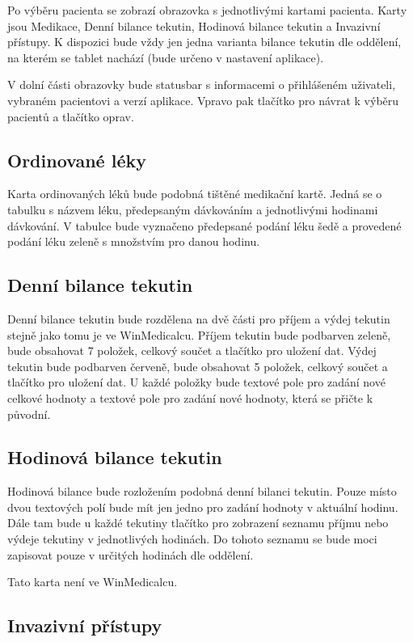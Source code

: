 Po výběru pacienta se zobrazí obrazovka s jednotlivými kartami pacienta. Karty jsou Medikace, Denní bilance tekutin, Hodinová bilance tekutin a Invazivní přístupy. K dispozici bude vždy jen jedna varianta bilance tekutin dle oddělení, na kterém se tablet nachází (bude určeno v nastavení aplikace).

V dolní části obrazovky bude statusbar s informacemi o přihlášeném uživateli, vybraném pacientovi a verzí aplikace. Vpravo pak tlačítko pro návrat k výběru pacientů a tlačítko oprav.

\subsection{Ordinované léky}

Karta ordinovaných léků bude podobná tištěné medikační kartě. Jedná se o tabulku s názvem léku, předepsaným dávkováním a jednotlivými hodinami dávkování. V tabulce bude vyznačeno předepsané podání léku šedě a provedené podání léku zeleně s množstvím pro danou hodinu.

\subsection{Denní bilance tekutin}

Denní bilance tekutin bude rozdělena na dvě části pro příjem a výdej tekutin stejně jako tomu je ve WinMedicalcu. Příjem tekutin bude podbarven zeleně, bude obsahovat 7 položek, celkový součet a tlačítko pro uložení dat. Výdej tekutin bude podbarven červeně, bude obsahovat 5 položek, celkový součet a tlačítko pro uložení dat. U každé položky bude textové pole pro zadání nové celkové hodnoty a textové pole pro zadání nové hodnoty, která se přičte k původní.

\subsection{Hodinová bilance tekutin}

Hodinová bilance bude rozložením podobná denní bilanci tekutin. Pouze místo dvou textových polí bude mít jen jedno pro zadání hodnoty v aktuální hodinu. Dále tam bude u každé tekutiny tlačítko pro zobrazení seznamu příjmu nebo výdeje tekutiny v jednotlivých hodinách. Do tohoto seznamu se bude moci zapisovat pouze v určitých hodinách dle oddělení.

Tato karta není ve WinMedicalcu.

\subsection{Invazivní přístupy}


